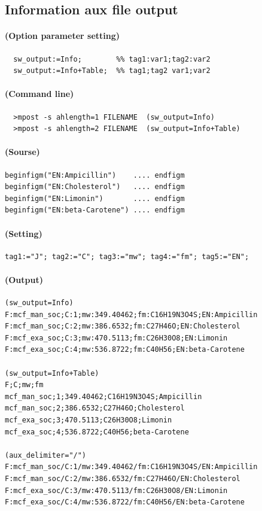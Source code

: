 \documentclass[a4paper]{article}
\begin{document}
\subsection{Information aux file output}
\paragraph{(Option parameter setting)}
%
%
%
%
%
%
%
%
%
%
%
%
%
%
%
%
%
\begin{verbatim}
  sw_output:=Info;        %% tag1:var1;tag2:var2
  sw_output:=Info+Table;  %% tag1;tag2 var1;var2
\end{verbatim}
\paragraph{(Command line)}
\begin{verbatim}
  >mpost -s ahlength=1 FILENAME  (sw_output=Info)
  >mpost -s ahlength=2 FILENAME  (sw_output=Info+Table)
\end{verbatim}
\paragraph{(Sourse)}
\begin{verbatim}
beginfigm("EN:Ampicillin")    .... endfigm
beginfigm("EN:Cholesterol")   .... endfigm
beginfigm("EN:Limonin")       .... endfigm
beginfigm("EN:beta-Carotene") .... endfigm
\end{verbatim}
\paragraph{(Setting)}
\begin{verbatim}
tag1:="J"; tag2:="C"; tag3:="mw"; tag4:="fm"; tag5:="EN";
\end{verbatim}
\paragraph{(Output)}
%
\begin{verbatim}
(sw_output=Info)
F:mcf_man_soc;C:1;mw:349.40462;fm:C16H19N3O4S;EN:Ampicillin
F:mcf_man_soc;C:2;mw:386.6532;fm:C27H46O;EN:Cholesterol
F:mcf_exa_soc;C:3;mw:470.5113;fm:C26H30O8;EN:Limonin
F:mcf_exa_soc;C:4;mw:536.8722;fm:C40H56;EN:beta-Carotene

(sw_output=Info+Table)
F;C;mw;fm
mcf_man_soc;1;349.40462;C16H19N3O4S;Ampicillin
mcf_man_soc;2;386.6532;C27H46O;Cholesterol
mcf_exa_soc;3;470.5113;C26H30O8;Limonin
mcf_exa_soc;4;536.8722;C40H56;beta-Carotene

(aux_delimiter="/")
F:mcf_man_soc/C:1/mw:349.40462/fm:C16H19N3O4S/EN:Ampicillin
F:mcf_man_soc/C:2/mw:386.6532/fm:C27H46O/EN:Cholesterol
F:mcf_exa_soc/C:3/mw:470.5113/fm:C26H30O8/EN:Limonin
F:mcf_exa_soc/C:4/mw:536.8722/fm:C40H56/EN:beta-Carotene
\end{verbatim}
\end{document}
